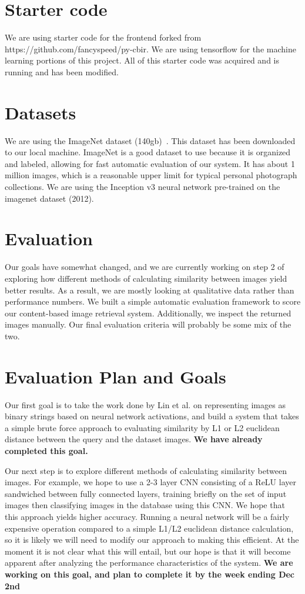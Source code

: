 \section{Starter code}
We are using starter code for the frontend forked from https://github.com/fancyspeed/py-cbir.
We are using tensorflow for the machine learning portions of this project.
All of this starter code was acquired and is running and has been modified.

\section{Datasets}
We are using the ImageNet dataset (140gb)~\cite{deng2009imagenet}. This dataset has been downloaded to our local machine.
ImageNet is a good dataset to use because it is organized and labeled, allowing for fast automatic evaluation of our system.
It has about 1 million images, which is a reasonable upper limit for typical personal photograph collections.
We are using the Inception v3 neural network pre-trained on the imagenet dataset (2012).

\section{Evaluation}
Our goals have somewhat changed, and we are currently working on step 2 of exploring how different methods of
calculating similarity between images yield better results.
As a result, we are mostly looking at qualitative data rather than performance numbers.
We built a simple automatic evaluation framework to score our content-based image retrieval system.
Additionally, we inspect the returned images manually. Our final evaluation criteria will probably be some mix of the two.

\section{Evaluation Plan and Goals}

Our first goal is to take the work done by Lin et al. on representing images as binary strings based on neural network activations,
and build a system that takes a simple brute force approach to evaluating similarity by L1 or L2 euclidean distance between the query and the dataset images.
\textbf{We have already completed this goal.}


Our next step is to explore different methods of calculating similarity between images.
For example, we hope to use a 2-3 layer CNN consisting of a ReLU layer sandwiched between fully connected layers,
training briefly on the set of input images then classifying images in the database using this CNN.
We hope that this approach yields higher accuracy.
Running a neural network will be a fairly expensive operation compared to a simple L1/L2 euclidean distance calculation,
so it is likely we will need to modify our approach to making this efficient.
At the moment it is not clear what this will entail, but our hope is that it will become apparent after analyzing
the performance characteristics of the system.
\textbf{We are working on this goal, and plan to complete it by the week ending Dec 2nd}

